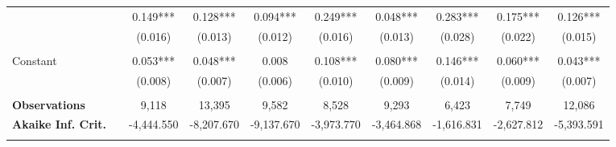 \begin{tabular*}{\linewidth}{@{\extracolsep{\fill} } llcccccccc}
\hline%
\arrayrulecolor{white}%
\hline%
\arrayrulecolor{white}%
\hline%
\multirow{2}{*}{\hspace{0.2cm}500+}&&0.149***&0.128***&0.094***&0.249***&0.048***&0.283***&0.175***&0.126***\\%
&&(0.016)&(0.013)&(0.012)&(0.016)&(0.013)&(0.028)&(0.022)&(0.015)\\%
\arrayrulecolor{white}%
\hline%
\arrayrulecolor{white}%
\hline%
\arrayrulecolor{white}%
\hline%
\arrayrulecolor{white}%
\hline%
\arrayrulecolor{white}%
\hline%
&&&&&&&&&\\%
\multirow{2}{*}{Constant}&&0.053***&0.048***&0.008&0.108***&0.080***&0.146***&0.060***&0.043***\\%
&&(0.008)&(0.007)&(0.006)&(0.010)&(0.009)&(0.014)&(0.009)&(0.007)\\%
\arrayrulecolor{white}%
\hline%
\arrayrulecolor{white}%
\hline%
\arrayrulecolor{white}%
\hline%
\arrayrulecolor{white}%
\hline%
\arrayrulecolor{white}%
\hline%
&&&&&&&&&\\%
\bfseries Observations&&9,118&13,395&9,582&8,528&9,293&6,423&7,749&12,086\\%
\bfseries Akaike Inf. Crit.&&{-}4,444.550&{-}8,207.670&{-}9,137.670&{-}3,973.770&{-}3,464.868&{-}1,616.831&{-}2,627.812&{-}5,393.591\\%
\arrayrulecolor{white}%
\hline%
\arrayrulecolor{white}%
\hline%
\arrayrulecolor{white}%
\hline%
\arrayrulecolor{white}%
\hline%
\arrayrulecolor{white}%
\hline%
\arrayrulecolor{black}%
\hline%
\end{tabular*}